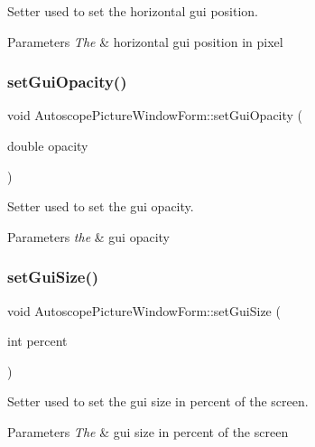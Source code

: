 Setter used to set the horizontal gui position. 


\begin{DoxyParams}{Parameters}
{\em The} & horizontal gui position in pixel \\
\hline
\end{DoxyParams}
\mbox{\label{class_autoscope_picture_window_form_acb47c88be96f7b6573cd6181d6e3865e}} 
\subsubsection{\texorpdfstring{setGuiOpacity()}{setGuiOpacity()}}
{\footnotesize\ttfamily void Autoscope\+Picture\+Window\+Form\+::set\+Gui\+Opacity (\begin{DoxyParamCaption}\item[{double}]{opacity }\end{DoxyParamCaption})}



Setter used to set the gui opacity. 


\begin{DoxyParams}{Parameters}
{\em the} & gui opacity \\
\hline
\end{DoxyParams}
\mbox{\label{class_autoscope_picture_window_form_ae968436e14e51184ca0f375f04947d4c}} 
\subsubsection{\texorpdfstring{setGuiSize()}{setGuiSize()}}
{\footnotesize\ttfamily void Autoscope\+Picture\+Window\+Form\+::set\+Gui\+Size (\begin{DoxyParamCaption}\item[{int}]{percent }\end{DoxyParamCaption})}



Setter used to set the gui size in percent of the screen. 


\begin{DoxyParams}{Parameters}
{\em The} & gui size in percent of the screen \\
\hline
\end{DoxyParams}
\mbox{\label{class_autoscope_picture_window_form_a687966c09f4fe03caa2b52c42a804ae1}} 
